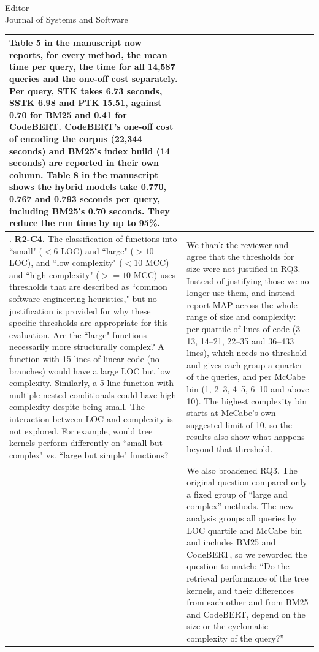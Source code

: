 \documentclass[
pagenumber=false, %
parskip=half, %
fromalign=right, %
foldmarks=false, %
addrfield=false %
]{scrlttr2}
\newcounter{commentcounter} %
\newcommand{\comment}[1]{\refstepcounter{commentcounter}\thecommentcounter.} %
\begin{document}
\begin{letter}{\\Editor\\Journal of Systems and Software}
\begin{longtable}{p{}p{}}
		Table 5 in the manuscript now reports, for every method, the mean time per query, the time for all 14,587 queries and the one-off cost separately. Per query, STK takes 6.73 seconds, SSTK 6.98 and PTK 15.51, against 0.70 for BM25 and 0.41 for CodeBERT. CodeBERT's one-off cost of encoding the corpus (22,344 seconds) and BM25's index build (14 seconds) are reported in their own column. Table 8 in the manuscript shows the hybrid models take 0.770, 0.767 and 0.793 seconds per query, including BM25's 0.70 seconds. They reduce the run time by up to 95\%.
		
		\\ \midrule 
		
		\comment{2}	\textbf{R2-C4.} The classification of functions into ``small" ($<6$ LOC) and ``large" ($>10$ LOC), and ``low complexity" ($<10$ MCC) and ``high complexity" ($>=10$ MCC) uses thresholds that are described as ``common software engineering heuristics," but no justification is provided for why these specific thresholds are appropriate for this evaluation. Are the ``large" functions necessarily more structurally complex? A function with 15 lines of linear code (no branches) would have a large LOC but low complexity. Similarly, a 5-line function with multiple nested conditionals could have high complexity despite being small. The interaction between LOC and complexity is not explored. For example, would tree kernels perform differently on ``small but complex" vs. ``large but simple" functions? & 
		
		We thank the reviewer and agree that the thresholds for size were not justified in RQ3. Instead of justifying those we no longer use them, and instead report MAP across the whole range of size and complexity: per quartile of lines of code
		(3--13, 14--21, 22--35 and 36--433 lines), which needs no threshold and gives each group a quarter of
		the queries, and per McCabe bin (1, 2--3, 4--5, 6--10 and above 10). The highest complexity bin starts at
		McCabe's own suggested limit of 10, so the results also show what happens beyond that threshold. \\

		& We also broadened RQ3. The original question compared only a fixed group
		of ``large and complex'' methods. The new analysis groups all queries by LOC quartile and McCabe bin
		and includes BM25 and CodeBERT, so we reworded the question to match: ``Do the retrieval performance of
		the tree kernels, and their differences from each other and from BM25 and CodeBERT, depend on the size
		or the cyclomatic complexity of the query?'' \\


\end{longtable}
\end{letter}
\end{document}
